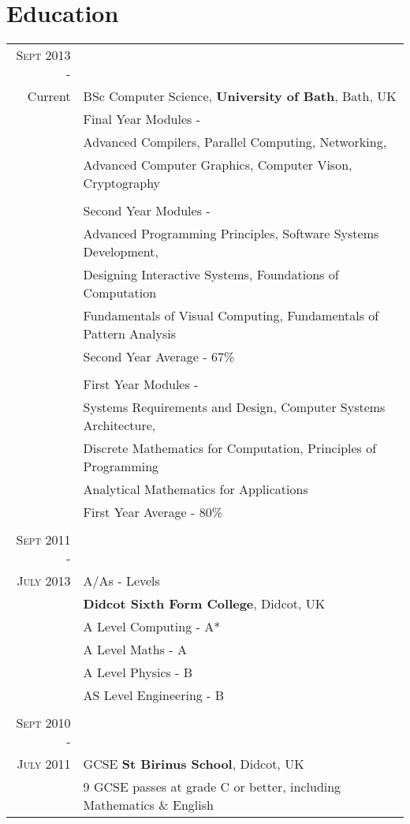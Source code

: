 \documentclass[a4paper,12pt]{article}
\begin{document}
\section{Education}
\begin{tabular}{rl}
 \textsc{Sept} 2013 -\\ Current & BSc Computer Science, \textbf{University of Bath}, Bath, UK\\
& Final Year Modules -\\
& \hspace{0.25cm} Advanced Compilers, Parallel Computing, Networking, \\ & \hspace{0.25cm} Advanced Computer Graphics, Computer Vison, Cryptography\\
& \\
& Second Year Modules -\\
& \hspace{0.25cm} Advanced Programming Principles, Software Systems Development, \\ & \hspace{0.25cm} Designing Interactive Systems, Foundations of Computation \\ & \hspace{0.25cm} Fundamentals of Visual Computing, Fundamentals of Pattern Analysis\\
& Second Year Average - 67\%\\
& \\
& First Year Modules -\\
& \hspace{0.25cm} Systems Requirements and Design, Computer Systems Architecture, \\ & \hspace{0.25cm} Discrete Mathematics for Computation, Principles of Programming\\ & \hspace{0.25cm} Analytical Mathematics for Applications\\
& First Year Average - 80\%\\
& \\
\textsc{Sept} 2011 -\\ \textsc{July} 2013 & A/As - Levels \\& \normalsize\textbf{Didcot Sixth Form College}, Didcot, UK\\
& A Level Computing - A*\\
& A Level Maths - A\\
& A Level Physics - B\\
& AS Level Engineering - B\\&\\
\textsc{Sept} 2010 -\\ \textsc{July} 2011& GCSE \textbf{St Birinus School}, Didcot, UK\\
&9 GCSE passes at grade C or better, including Mathematics \& English \\
\end{tabular}
\end{document}
